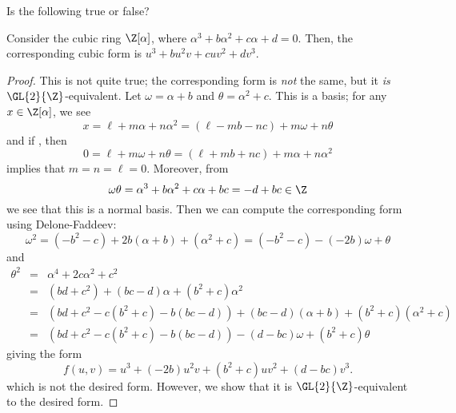\documentclass[10pt]{amsart}
\begin{document}
\setcounter{thm}{9}
\begin{thm}
  Is the following true or false?
  
  Consider the cubic ring $\Z[\alpha]$, where $\alpha^3 + b\alpha^2 + c\alpha + d = 0$.
  Then, the corresponding cubic form is $u^3 + bu^2v + cuv^2 + dv^3$.
  
  \begin{proof}
    This is not quite true; the corresponding form is {\it not} the same, but it {\it is} $\GL{2}{\Z}$-equivalent.
    Let $\omega = \alpha + b$ and $\theta = \alpha^2 + c$.
    This is a basis; for any $x \in \Z[\alpha]$, we see
    $$x = \ell + m\alpha + n\alpha^2 = (\ell - mb - nc) + m\omega + n\theta$$
    and if , then
    $$0 = \ell + m\omega + n\theta = (\ell + mb + nc) + m\alpha + n\alpha^2$$
    implies that $m = n = \ell = 0$.
    Moreover, from
    $$\omega\theta = \alpha^3 + b\alpha^2 + c\alpha + bc = -d + bc \in \Z$$
    we see that this is a normal basis.
    Then we can compute the corresponding form using Delone-Faddeev:
    $$\omega^2 = (-b^2 - c) + 2b(\alpha + b) + (\alpha^2 + c) = (-b^2 - c) - (-2b)\omega + \theta$$
    and
    \begin{eqnarray*}
      \theta^2 &=& \alpha^4 + 2c\alpha^2 + c^2\\
      &=& (bd + c^2) + (bc - d)\alpha + (b^2 + c)\alpha^2\\
      &=& (bd + c^2 - c(b^2 + c) - b(bc - d)) + (bc - d)(\alpha + b) + (b^2 + c)(\alpha^2 + c)\\
      &=& (bd + c^2 - c(b^2 + c) - b(bc - d)) - (d - bc)\omega + (b^2 + c)\theta
    \end{eqnarray*}
    giving the form
    $$f(u,v) = u^3 + (-2b)u^2v + (b^2 + c)uv^2 + (d - bc)v^3.$$
    which is not the desired form.
    However, we show that it is $\GL{2}{\Z}$-equivalent to the desired form.
    

\end{proof}
\end{thm}
\end{document}
